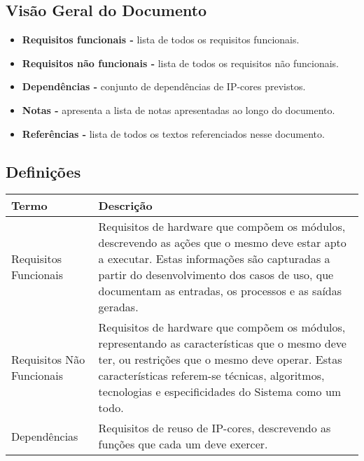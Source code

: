 \documentclass{article}
\begin{document}
\subsection{Visão Geral do Documento}
  \begin{itemize}
   \item \textbf{Requisitos funcionais -} lista de todos os requisitos funcionais.
   \item \textbf{Requisitos não funcionais -} lista de todos os requisitos não funcionais.
   \item \textbf{Dependências -} conjunto de dependências de IP-cores previstos.
   \item \textbf{Notas -} apresenta a lista de notas apresentadas ao longo do documento.
   \item \textbf{Referências -} lista de todos os textos referenciados nesse documento.
  \end{itemize}

  \subsection{Definições}
    \FloatBarrier
    \begin{table}[H]
      \begin{center}
        \begin{tabular}[pos]{|m{5cm} | m{9cm}|} 
          \hline
          \cellcolor[gray]{0.9}\textbf{Termo} & \cellcolor[gray]{0.9}\textbf{Descrição} \\ \hline
          Requisitos Funcionais & Requisitos de hardware que compõem os módulos, descrevendo as ações que o mesmo deve estar apto a executar. Estas informações são capturadas a partir do desenvolvimento dos casos de uso, que documentam as entradas, os processos e as saídas geradas.  \\ \hline
          Requisitos Não Funcionais & Requisitos de hardware que compõem os módulos, representando as características que o mesmo deve ter, ou restrições que o mesmo deve operar. Estas características referem-se técnicas, algoritmos, tecnologias e especificidades do Sistema como um todo.  \\ \hline
          Dependências & Requisitos de reuso de IP-cores, descrevendo as funções que cada um deve exercer. \\ \hline
        \end{tabular}
      \end{center}
    \end{table}  
\end{document}
